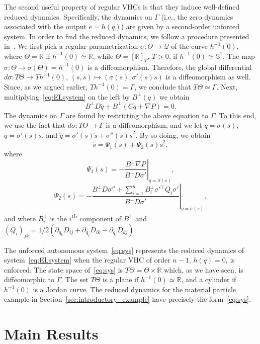 The second useful property of regular VHCs is that they induce
well-defined reduced dynamics. Specifically, the dynamics on $\Gamma$
(i.e., the zero dynamics associated with the output $e=h(q)$) are
given by a second-order unforced system. In order to find the reduced
dynamics, we follow a procedure presented in~\cite{Dame-2012a}. We
first pick a regular parametrization $\sigma:\Theta \to \mathcal{Q}$ of the
curve $h^{-1}(0)$, where $\Theta = \mathbb{R}$ if $h^{-1}(0) \simeq \mathbb{R}$,
while $\Theta = [\mathbb{R}]_T$, $T>0$, if $h^{-1}(0) \simeq \mathbb{S}^1$. The map
$\sigma:\Theta \to \sigma(\Theta) = h^{-1}(0)$ is a
diffeomorphism. Therefore, the global differential $d\sigma: T \Theta
\to T h^{-1}(0)$, $(s,\dot s) \mapsto (\sigma(s),\sigma'(s)\dot s)$ is
a diffeomorphism as well. Since, as we argued earlier, $Th^{-1}(0) =
\Gamma$, we conclude that $T \Theta \simeq \Gamma$. Next,
multiplying~\eqref{eq:ELsystem} on the left by $B^\perp(q)$ we obtain
\[
B^\perp D \ddot q + B^\perp (C \dot q + \nabla P) =0.
\]
The dynamics on $\Gamma$ are found by restricting the above equation
to $\Gamma$. To this end, we use the fact that $d \sigma : T\Theta \to
\Gamma$ is a diffeomorphism, and we let $q = \sigma(s)$, $\dot
q=\sigma'(s) \dot s$, and $\ddot q = \sigma'(s) \ddot s + \sigma''(s)
\dot s^2$. By so doing, we obtain
\begin{equation}\label{eq:sys}
\ddot s = \Psi_1(s) + \Psi_2(s) \dot s^2,
\end{equation}
where 
\[
\Psi_1(s) = -\left.\frac{B^\perp\nabla P}{B^\perp D\sigma'}\right|_{q=\sigma(s)},
\]
\[
\Psi_2(s) = -\left.\frac{B^\perp
	D\sigma''+\sum_{i=1}^{n}B^\perp_i\sigma'{}^\top Q_i\sigma'}{B^\perp
	D\sigma'}\right|_{q=\sigma(s)},
\]
and where $B^\perp_i$ is the $i$\textsuperscript{th} component of
$B^\perp$ and
$(Q_i)_{jk}=1/2(\partial_{q_k}D_{ij}+\partial_{q_j}D_{ik}-\partial_{q_i}D_{kj})$.

The unforced autonomous system~\eqref{eq:sys} represents the
reduced dynamics of system~\eqref{eq:ELsystem} when the regular VHC of
order $n-1$, $h(q)=0$, is enforced.  The state space
of~\eqref{eq:sys} is $T\Theta = \Theta \times \mathbb{R}$ which, as we
have seen, is diffeomorphic to $\Gamma$. The set $T \Theta$ is a plane
if $h^{-1}(0) \simeq \mathbb{R}$, and a cylinder if $h^{-1}(0)$ is a Jordan
curve.  The reduced dynamics for the material particle example in
Section~\ref{sec:introductory_example} have precisely the
form~\eqref{eq:sys}.

\section{Main Results}
\label{sec:InvLagProb}

